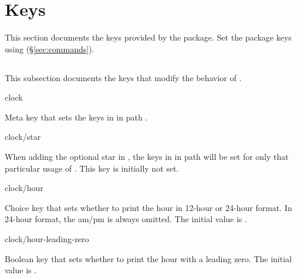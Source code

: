 \documentclass{beery}
\begin{document}
\section{Keys}
\label{sec:keys}

This section documents the keys provided by the  package.
Set the package keys using  (\S\ref{sec:commands}).


\subsection{}
\label{subsec:clock}

This subsection documents the keys that modify the behavior of .

\begin{variable}{clock}
  \begin{syntax}
  \end{syntax}
  Meta key that sets the keys in  in path .
\end{variable}

\begin{variable}{clock/star}
  \begin{syntax}
  \end{syntax}
  When adding the optional star in , the keys in  in path  will be set for only that particular usage of .
  This key is initially not set.
\end{variable}

\begin{variable}{clock/hour}
  \begin{syntax}
  \end{syntax}
  Choice key that sets whether to print the hour in 12-hour or 24-hour format.
  In 24-hour format, the am/pm is always omitted.
  The initial value is .
\end{variable}

\begin{variable}{clock/hour-leading-zero}
  \begin{syntax}
  \end{syntax}
  Boolean key that sets whether to print the hour with a leading zero.
  The initial value is .
\end{variable}
\end{document}

